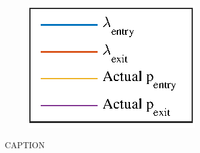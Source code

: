 \begin{figure}[htbp]
	\hspace*{\fill}
	\begin{subfigure}[t]{0.5\linewidth}
		\centering
		\includegraphics[scale = 1]{chapters/appendix/figures/learning_curves/legend}
		
	\end{subfigure}
	\hspace*{\fill}

	\caption{CAPTION}
	\label{fig:all_learnings_sim_1}
\end{figure}

